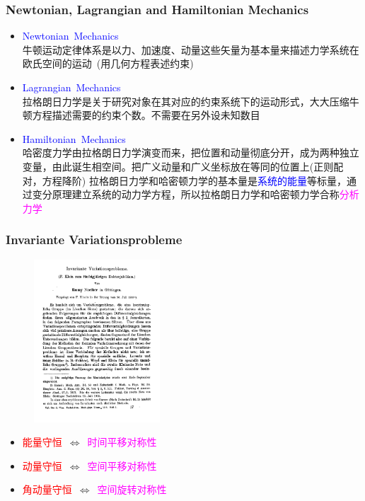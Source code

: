 \frame
{
	\frametitle{\textrm{\small Newtonian, Lagrangian and Hamiltonian Mechanics}}
	\begin{itemize}
   		\setlength{\itemsep}{10pt}
		\item \textrm{\textcolor{blue}{Newtonian~Mechanics}}\\
		牛顿运动定律体系是以力、加速度、动量这些矢量为基本量来描述力学系统在欧氏空间的运动~(用几何方程表述约束)
	\item \textrm{\textcolor{blue}{Lagrangian~Mechanics}}\\
		拉格朗日力学是关于研究对象在其对应的约束系统下的运动形式，大大压缩牛顿方程描述需要的约束个数。不需要在另外设未知数目
	\item \textrm{\textcolor{blue}{Hamiltonian~Mechanics}}\\
		哈密度力学由拉格朗日力学演变而来，把位置和动量彻底分开，成为两种独立变量，由此诞生相空间。把广义动量和广义坐标放在等同的位置上(正则配对，方程降阶)
		\vskip 6pt
		拉格朗日力学和哈密顿力学的基本量是\textcolor{blue}{系统的能量}等标量，通过变分原理建立系统的动力学方程，所以拉格朗日力学和哈密顿力学合称\textcolor{magenta}{分析力学}
	\end{itemize}
}

\frame
{
	\frametitle{\textrm{Invariante Variationsprobleme}}
\begin{figure}[h!]
\centering
%
\vspace{-10.5pt}
\includegraphics[height=0.52\textwidth,width=0.42\textwidth,viewport=0 0 450 580,clip]{Figures/Noether_theorem-1st_page.png}
\label{Noether_theorem}
\end{figure}
\begin{itemize}
\centering
	\item \textcolor{red}{能量守恒}~$\Longleftrightarrow$~\textcolor{magenta}{时间平移对称性}
	\item \textcolor{red}{动量守恒}~$\Longleftrightarrow$~\textcolor{magenta}{空间平移对称性}
	\item \textcolor{red}{角动量守恒}~$\Longleftrightarrow$~\textcolor{magenta}{空间旋转对称性}
\end{itemize}
}

